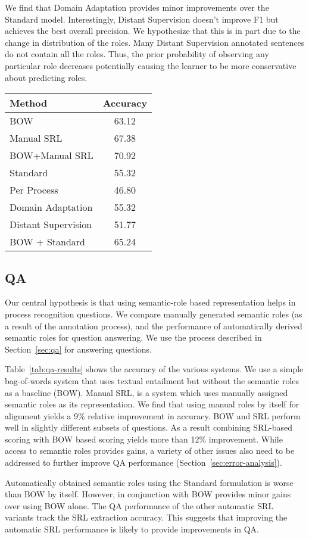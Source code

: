 We find that Domain Adaptation provides minor improvements over the Standard model. Interestingly, Distant Supervision doesn't improve F1 but achieves the best overall precision. 
We hypothesize that this is in part due to the change in distribution of the roles. 
Many Distant Supervision annotated sentences do not contain all the roles. 
Thus, the prior probability of observing any particular role decreases potentially causing the learner to be more conservative about predicting roles.  
\begin{table}[htdp]
\begin{center}
\begin{tabular}{|l|c|}
\hline
Method & Accuracy\\
\hline
BOW & 63.12\\
Manual SRL & 67.38\\
BOW+Manual SRL & 70.92\\
\hline
Standard	& 55.32\\
Per Process & 46.80 \\
Domain Adaptation & 55.32\\
Distant Supervision & 51.77\\
\hline
BOW + Standard  & 65.24\\
\hline
\end{tabular}
\end{center}
\end{table}

\subsection{QA}

Our central hypothesis is that using semantic-role based representation helps in process recognition questions. We compare manually generated semantic roles (as a result of the annotation process), and the performance of automatically derived semantic roles for question answering. We use the process described in Section~\ref{sec:qa} for answering questions. 

Table~\ref{tab:qa-results} shows the accuracy of the various systems. We use a simple bag-of-words system that uses textual entailment but without the semantic roles  as a baseline (BOW). Manual SRL, is a system which uses manually assigned semantic roles as its representation. We find that using manual roles by itself for alignment yields a 9\% relative improvement in accuracy. BOW and SRL perform well in slightly different subsets of questions. As a result combining SRL-based scoring with BOW based scoring yields more than 12\% improvement. While access to semantic roles provides gains, a variety of other issues also need to be addressed to further improve QA performance (Section~\ref{sec:error-analysis}).

Automatically obtained semantic roles using the Standard formulation is worse than BOW by itself. However, in conjunction with BOW provides minor gains over using BOW alone. The QA performance of the other automatic SRL variants track the SRL extraction accuracy. This suggests that improving the automatic SRL performance is likely to provide improvements in QA. 


